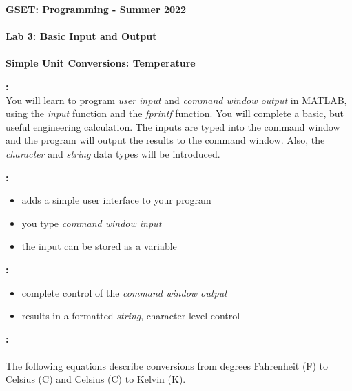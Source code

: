 \documentclass[11pt]{article}
\newcommand{\secNum}{GSET: Programming}
\newcommand{\assnType}{Lab}
\newcommand{\assnTitle}{Basic Input and Output}
\newcommand{\assnNum}{3}
\newcommand{\currTerm}{Summer 2022}
\begin{document}
	\textbf{\LARGE \secNum \hspace{1mm} - \hspace{1mm} \currTerm} \\\\
  \textbf{\LARGE \assnType \hspace{1mm}  \assnNum : \assnTitle} \\\\
	\textbf{\LARGE Simple Unit Conversions: Temperature} \\
	
	
	\begin{description}
        \vspace{3mm}
		\item [\textbf{ \Large Overview}] \textbf{ \Large :}\\
			\Large
			You will learn to program {\it user input} and {\it command window output} in MATLAB, using the {\it input} function and the {\it fprintf} function. You will complete a basic, but useful engineering calculation. The inputs are typed into the command window and the program will output the results to the command window. Also, the {\it character} and {\it string} data types will be introduced. \\
			
 	\item [\textbf{ \Large the {\it input()} function}] \textbf{ \Large :}\\   
            	\Large
            	\begin{itemize}
            		\item adds a simple user interface to your program
            		\item you type {\it command window input} 
            		\item the input can be stored as a variable	
            	\end{itemize}
        \vspace{5mm}
            
        \item [\textbf{ \Large the {\it fprintf()} function}] \textbf{ \Large :}\\   
            	\Large
            	\begin{itemize}
            		\item complete control of the {\it command window output}	
            		\item results in a formatted {\it string}, character level control 
            	\end{itemize}
            \vspace{5mm}
 \item [\textbf{ \Large Temperature Conversions}] \textbf{ \Large :}\\ \\
            The following equations describe conversions from degrees Fahrenheit (F) to Celsius (C) and Celsius (C) to Kelvin (K).\\


\end{description}
\end{document}
